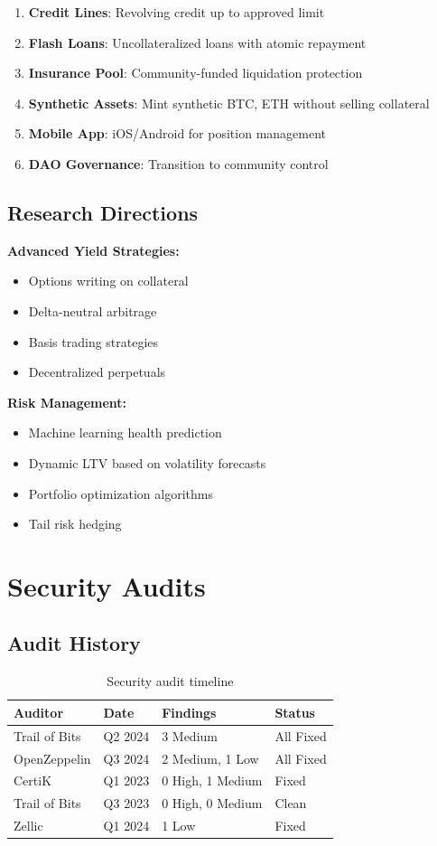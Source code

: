 \documentclass[11pt,a4paper]{article}
\begin{document}
\begin{enumerate}
\item \textbf{Credit Lines}: Revolving credit up to approved limit
\item \textbf{Flash Loans}: Uncollateralized loans with atomic repayment
\item \textbf{Insurance Pool}: Community-funded liquidation protection
\item \textbf{Synthetic Assets}: Mint synthetic BTC, ETH without selling collateral
\item \textbf{Mobile App}: iOS/Android for position management
\item \textbf{DAO Governance}: Transition to community control
\end{enumerate}

\subsection{Research Directions}

\textbf{Advanced Yield Strategies:}
\begin{itemize}
\item Options writing on collateral
\item Delta-neutral arbitrage
\item Basis trading strategies
\item Decentralized perpetuals
\end{itemize}

\textbf{Risk Management:}
\begin{itemize}
\item Machine learning health prediction
\item Dynamic LTV based on volatility forecasts
\item Portfolio optimization algorithms
\item Tail risk hedging
\end{itemize}

\section{Security Audits}

\subsection{Audit History}

\begin{table}[h]
\centering
\begin{tabular}{@{}llll@{}}
\toprule
\textbf{Auditor} & \textbf{Date} & \textbf{Findings} & \textbf{Status} \\ \midrule
Trail of Bits & Q2 2024 & 3 Medium & All Fixed \\
OpenZeppelin & Q3 2024 & 2 Medium, 1 Low & All Fixed \\
CertiK & Q1 2023 & 0 High, 1 Medium & Fixed \\
Trail of Bits & Q3 2023 & 0 High, 0 Medium & Clean \\
Zellic & Q1 2024 & 1 Low & Fixed \\ \bottomrule
\end{tabular}
\caption{Security audit timeline}
\end{table}
\end{document}
